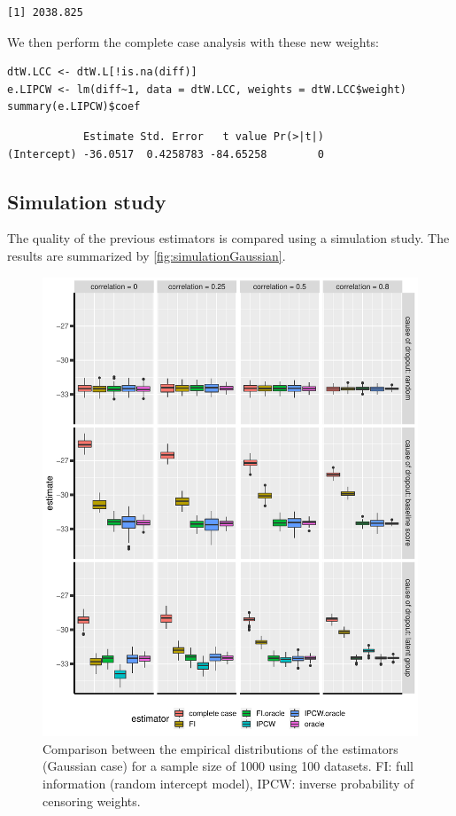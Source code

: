 \documentclass[12pt]{article}
\begin{document}
\begin{verbatim}
[1] 2038.825
\end{verbatim}


We then perform the complete case analysis with these new weights:
\lstset{language=r,label= ,caption= ,captionpos=b,numbers=none}
\begin{lstlisting}
dtW.LCC <- dtW.L[!is.na(diff)]
e.LIPCW <- lm(diff~1, data = dtW.LCC, weights = dtW.LCC$weight)
summary(e.LIPCW)$coef
\end{lstlisting}

\begin{verbatim}
            Estimate Std. Error   t value Pr(>|t|)
(Intercept) -36.0517  0.4258783 -84.65258        0
\end{verbatim}


\clearpage

\subsection{Simulation study}
\label{sec:org678db91}

The quality of the previous estimators is compared using a simulation
study. The results are summarized by \autoref{fig:simulationGaussian}.

\begin{figure}[!h]
\centering
\includegraphics[width=\textwidth]{./figures/simStudy-bias.pdf}
\caption{\label{fig:simulationGaussian}Comparison between the empirical distributions of the estimators (Gaussian case) for a sample size of 1000 using 100 datasets. FI: full information (random intercept model), IPCW: inverse probability of censoring weights.}
\end{figure}
\end{document}
